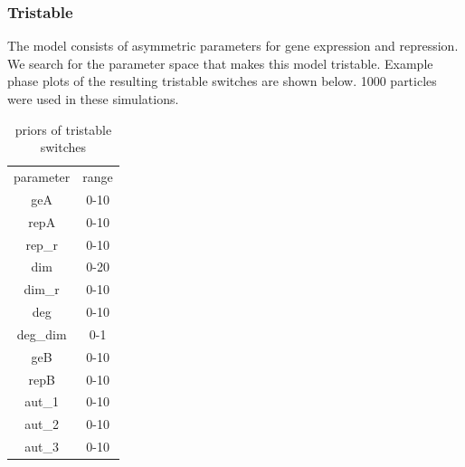 
\clearpage
\subsubsection{Tristable}
The model consists of asymmetric parameters for gene expression and repression. We search for the parameter space that makes this model tristable. Example phase plots of the resulting tristable switches are shown below. 1000 particles were used in these simulations.
 
 \begin{table}[htbp]
\centering
\caption{priors of tristable switches}
\label{tab:priors_tri}
\begin{tabular}{cc}
parameter & range \\
geA & 0-10 \\
repA & 0-10 \\
rep\_r & 0-10 \\
dim & 0-20 \\
dim\_r & 0-10 \\
deg & 0-10 \\
deg\_dim & 0-1 \\
geB & 0-10 \\
repB & 0-10 \\
aut\_1 & 0-10 \\
aut\_2 & 0-10 \\
aut\_3 & 0-10
\end{tabular}
\end{table}

